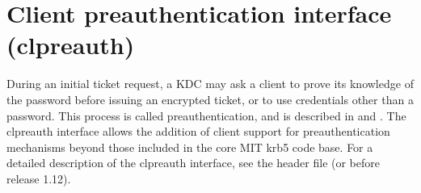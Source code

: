 \documentclass[letterpaper,10pt,english]{sphinxmanual}
\begin{document}
\section{Client preauthentication interface (clpreauth)}
\label{\detokenize{plugindev/clpreauth:client-preauthentication-interface-clpreauth}}\label{\detokenize{plugindev/clpreauth::doc}}
\sphinxAtStartPar
During an initial ticket request, a KDC may ask a client to prove its
knowledge of the password before issuing an encrypted ticket, or to
use credentials other than a password.  This process is called
preauthentication, and is described in  and .
The clpreauth interface allows the addition of client support for
preauthentication mechanisms beyond those included in the core MIT
krb5 code base.  For a detailed description of the clpreauth
interface, see the header file  (or
 before release 1.12).
\end{document}
